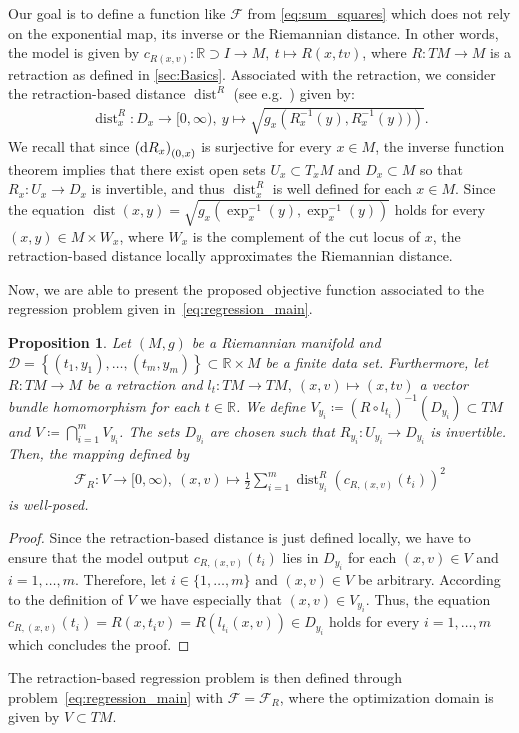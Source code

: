 \documentclass[11pt,a4paper]{article}
\theoremstyle{plain}
\newtheorem{proposition}[theorem]{Proposition}
\theoremstyle{definition}
\newcommand{\RR}{\mathbb{R}}
\DeclareMathOperator{\dist}{dist}
\begin{document}
Our goal is to define a function like $\mathcal{F}$ from \eqref{eq:sum_squares} which does not rely on the exponential map, its inverse or the Riemannian distance. In other words, the model is given by $c_{R(x, v)}\colon \RR\supset I\to M,\ t\mapsto R(x, tv)$, where $R\colon TM\to M$ is a retraction as defined in \cref{sec:Basics}. Associated with the retraction, we consider the retraction-based distance $\dist^R$ (see e.g.~\cite{bergmann2025}) given by:
\begin{align*}
		\dist_x^R\colon D_x\to [0, \infty),\ 
		y\mapsto \sqrt{g_x\left(R_x^{-1}(y), R_x^{-1}(y))\right)}.
\end{align*}
We recall that since $\left(\textup{d}R_x\right)_{(0, x)}$ is surjective for every $x\in M$, the inverse function theorem implies that there exist open sets $U_x\subset T_xM$ and $D_x\subset M$ so that $R_x\colon U_x\to D_x$ is invertible, and thus $\dist_x^R$ is well defined for each $x\in M$. Since the equation $\dist(x, y) = \sqrt{g_x\left(\exp_x^{-1}(y), \exp_x^{-1}(y)\right)}$ holds  for every $(x, y)\in M\times W_x$, where $W_x$ is the complement of the cut locus of $x$, the retraction-based distance locally approximates the Riemannian distance.

Now, we are able to present the proposed objective function associated to the regression problem given in~\eqref{eq:regression_main}.
\begin{proposition}
	\label{prop:well-posed}
	Let $(M, g)$ be a Riemannian manifold and $\mathcal{D} = \left\{(t_1, y_1), \ldots, (t_m, y_m)\right\}\subset \RR\times M$ be a finite data set.  Furthermore, let $R\colon TM\to M$ be a retraction and $l_t\colon TM\to TM,\  (x, v)\mapsto (x, tv)$ a vector bundle homomorphism for each $t\in\RR$. We define $V_{y_i}\coloneqq (R\circ l_{t_i})^{-1}(D_{y_i})\subset TM$ and $V\coloneqq \bigcap\limits_{i=1}^m V_{y_i}$. The sets $D_{y_i}$ are chosen such that $R_{y_i} \colon U_{y_i} \to D_{y_i}$ is invertible.
	Then, the mapping defined by 
	\begin{align}
		\label{map: objective function}
		\mathcal{F}_R\colon V\to [0, \infty),\
		(x, v)\mapsto \frac{1}{2} \sum\limits_{i=1}^m \dist_{y_i}^R\left(c_{R, (x, v)}(t_i)\right)^2
	\end{align}
	is well-posed. 
\end{proposition}
\begin{proof}
	Since the retraction-based distance is just defined locally, we have to ensure that the model output $c_{R, (x, v)}(t_i)$ lies in $D_{y_i}$ for each $(x, v)\in V$ and $i=1, \ldots, m$. Therefore, let $i\in\{1, \ldots, m\}$ and $(x, v)\in V$ be arbitrary. According to the definition of $V$ we have especially that $(x,v)\in V_{y_i}$. Thus, the equation $c_{R, (x, v)}(t_i) = R(x, t_iv) = R\left(l_{t_i}(x, v)\right)\in D_{y_i}$ holds for every $i= 1, \ldots, m$ which concludes the proof. 
\end{proof}
The retraction-based regression problem is then defined through problem~\eqref{eq:regression_main} with $\mathcal{F} = \mathcal{F}_R$, where the optimization domain is given by $V\subset TM$.
\end{document}
